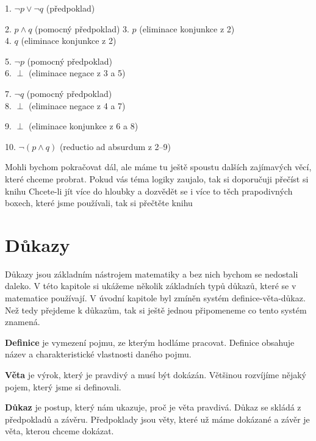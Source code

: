 \begin{example}
  \begin{proofbox}

    1. $\neg p \lor \neg q$ (předpoklad)
    \begin{proofbox}
      2. $p \land q$ (pomocný předpoklad)
      3. $p$ (eliminace konjunkce z 2) \\
      4. $q$ (eliminace konjunkce z 2)
      \begin{proofbox}
        5. $\neg p$ (pomocný předpoklad) \\
        6. $\perp$ (eliminace negace z 3 a 5)
      \end{proofbox}
      \begin{proofbox}
        7. $\neg q$ (pomocný předpoklad) \\
        8. $\perp$ (eliminace negace z 4 a 7)
      \end{proofbox}
      9. $\perp$ (eliminace konjunkce z 6 a 8)
    \end{proofbox}
    10. $\neg(p \land q)$ (reductio ad absurdum z 2--9)
  \end{proofbox}

\end{example}

Mohli bychom pokračovat dál, ale máme tu ještě spoustu dalších zajímavých věcí, které chceme probrat. Pokud vás téma logiky zaujalo, tak si doporučuji přečíst si knihu 
Chcete-li jít více do hloubky a dozvědět se i více to těch prapodivných boxech, které jsme používali, tak si přečtěte knihu
\section{Důkazy}
Důkazy jsou základním nástrojem matematiky a bez nich bychom se nedostali daleko. V této kapitole si ukážeme několik základních typů důkazů, které se v matematice používají. V úvodní kapitole byl zmíněn systém definice-věta-důkaz. Než tedy přejdeme k důkazům, tak si ještě jednou připomeneme co tento systém znamená.

\begin{definitionbox}
  \textbf{Definice} je vymezení pojmu, ze kterým hodláme pracovat. Definice obsahuje název a charakteristické vlastnosti daného pojmu.

  \textbf{Věta} je výrok, který je pravdivý a musí být dokázán. Většinou rozvíjíme nějaký pojem, který jsme si definovali.

  \textbf{Důkaz} je postup, který nám ukazuje, proč je věta pravdivá. Důkaz se skládá z předpokladů a závěru. Předpoklady jsou věty, které už máme dokázané a závěr je věta, kterou chceme dokázat.
\end{definitionbox}

